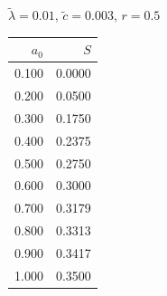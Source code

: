 \documentclass[11pt,a4paper]{article}
\begin{document}
\begin{minipage}[t]{\textwidth}
\begin{minipage}[t]{0.32\textwidth}
        \footnotesize
        \begin{flushleft}$\tilde{\lambda}=0.01$, $\tilde{c}=0.003$, $r=0.5$\end{flushleft}
        \begin{tabular}[t]{rr}
            $a_0$ & $S$ \\
            \hline
             0.100 & 0.0000 \\
             0.200 & 0.0500 \\
             0.300 & 0.1750 \\
             0.400 & 0.2375 \\
             0.500 & 0.2750 \\
             0.600 & 0.3000 \\
             0.700 & 0.3179 \\
             0.800 & 0.3313 \\
             0.900 & 0.3417 \\
             1.000 & 0.3500 \\
        \end{tabular}
    \end{minipage}
\end{minipage}
\end{document}
